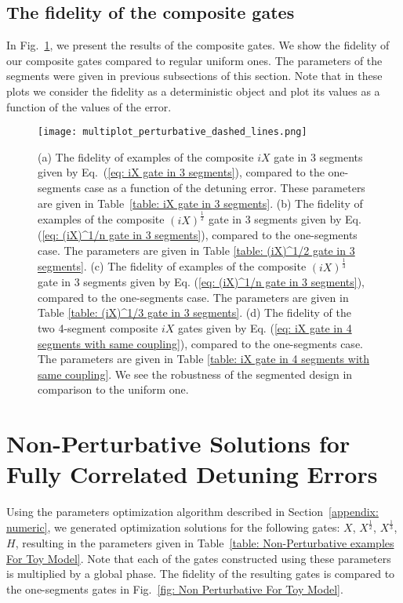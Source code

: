 \documentclass[floatfix,reprint, amsmath,amssymb,aps,superscriptaddress,nofootinbib]{revtex4-2}
\begin{document}
\subsection{The fidelity of the composite gates \label{subAppendix: fidelity of analytical composite}}

In Fig.~\ref{fig: Analytical For Toy Model}, we present the results of the composite gates. We show the fidelity of our composite gates compared to regular uniform ones. The parameters of the segments were given in previous subsections of this section. Note that in these plots we consider the fidelity as a deterministic object and plot its values as a function of the values of the error.

\begin{figure}[tb]{}
         \centering
    \texttt{[image: multiplot\_perturbative\_dashed\_lines.png]}
         \caption{(a) The fidelity of examples of the composite $iX$ gate in 3 segments given by Eq.~(\ref{eq: iX gate in 3 segments}), compared to the one-segments case as a function of the detuning error. These parameters are given in Table~\ref{table: iX gate in 3 segments}. (b) The fidelity of examples of the composite ${\left(iX\right)}^{\frac{1}{2}}$ gate in 3 segments given by Eq. (\ref{eq: (iX)^1/n gate in 3 segments}), compared to the one-segments case. The parameters are given in Table \ref{table: (iX)^1/2 gate in 3 segments}. (c) The fidelity of examples of the composite ${\left(iX\right)}^{\frac{1}{3}}$ gate in 3 segments given by Eq. (\ref{eq: (iX)^1/n gate in 3 segments}), compared to the one-segments case. The parameters are given in Table \ref{table: (iX)^1/3 gate in 3 segments}. (d) The fidelity of the two 4-segment composite $iX$ gates given by Eq. (\ref{eq: iX gate in 4 segments with same coupling}), compared to the one-segments case.  The parameters are given in Table \ref{table: iX gate in 4 segments with same coupling}. We see the robustness of the segmented design in comparison to the uniform one.}
         \label{fig: Analytical For Toy Model}
     \end{figure}


\section{Non-Perturbative Solutions for Fully Correlated Detuning Errors\label{appendix: Non-Perturbative Solutions for The Toy Model}}
Using the parameters optimization algorithm described in Section~\ref{appendix: numeric},  we generated optimization solutions for the following gates: $X$, $X^{\frac{1}{2}}$, $X^{\frac{1}{3}}$, $H$, resulting in the parameters given in Table~\ref{table: Non-Perturbative examples For Toy Model}.
Note that each of the gates constructed using these parameters is multiplied by a global phase.
The fidelity of the resulting gates is compared to the one-segments gates in Fig.~\ref{fig: Non Perturbative For Toy Model}.
\end{document}
